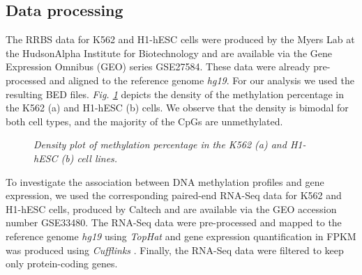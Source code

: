 \subsection{Data processing} \label{meth-encode-data-subsect}
The RRBS data for K562 and H1-hESC cells were produced by the Myers Lab at the HudsonAlpha Institute for Biotechnology and are available via the Gene Expression Omnibus (GEO) series GSE27584. These data were already pre-processed and aligned to the reference genome \emph{hg19}. For our analysis we used the resulting BED files. \emph{Fig. \ref{meth-dens-pic}} depicts the density of the methylation percentage in the K562 (a) and H1-hESC (b) cells. We observe that the density is bimodal for both cell types, and the majority of the CpGs are unmethylated. 

\begin{figure}[ht!]
     \begin{center}
    \end{center}
    \caption{\emph{Density plot of methylation percentage in the K562 (a) and H1-hESC (b) cell lines.}}
   \label{meth-dens-pic}
\end{figure}

To investigate the association between DNA methylation profiles and gene expression, we used the corresponding paired-end RNA-Seq data for K562 and H1-hESC cells, produced by Caltech and are available via the GEO accession number GSE33480. The RNA-Seq data were pre-processed and mapped to the reference genome \emph{hg19} using \emph{TopHat} \citep{Trapnell2009} and gene expression quantification in FPKM was produced using \emph{Cufflinks} \citep{Trapnell2010}. Finally, the RNA-Seq data were filtered to keep only protein-coding genes. 

